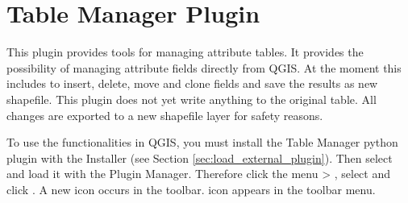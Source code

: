 
\section{Table Manager Plugin}\label{sec:ftools}


This plugin provides tools for managing attribute tables. It provides the 
possibility of managing attribute fields directly from QGIS. At the moment 
this includes to insert, delete, move and clone fields and save the results 
as new shapefile. This plugin does not yet write anything to the original 
table. All changes are exported to a new shapefile layer for safety reasons.


To use the functionalities in QGIS, you must install the Table Manager python 
plugin with the  Installer (see Section 
\ref{sec:load_external_plugin}). Then select and load it with the Plugin Manager. 
Therefore click the menu  > 
, select  and click 
. A new  icon occurs 
in the toolbar. icon appears in the toolbar menu.
